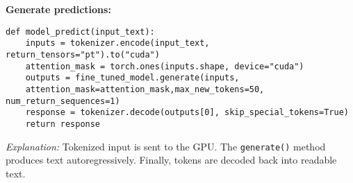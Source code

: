 \begin{tcolorbox}[colback=yellow!5!white, colframe=yellow!80!black, title=\textbf{Generating Text with the Fine-tuned Model}, 
                  coltitle=black, fonttitle=\bfseries, enhanced, sharp corners, boxrule=1pt]
    \textbf{Generate predictions:}
    \begin{verbatim}
def model_predict(input_text):
    inputs = tokenizer.encode(input_text, return_tensors="pt").to("cuda")
    attention_mask = torch.ones(inputs.shape, device="cuda")
    outputs = fine_tuned_model.generate(inputs, 
    attention_mask=attention_mask,max_new_tokens=50, num_return_sequences=1)
    response = tokenizer.decode(outputs[0], skip_special_tokens=True)   
    return response

    \end{verbatim}
    \textit{Explanation:} Tokenized input is sent to the GPU. The \texttt{generate()} 
    method produces text autoregressively. Finally, tokens are decoded back into readable text.

\end{tcolorbox}

